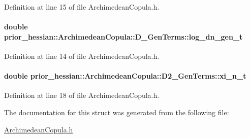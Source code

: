 Definition at line 15 of file Archimedean\+Copula.\+h.

\paragraph[{\texorpdfstring{log\+\_\+dn\+\_\+gen\+\_\+t}{log_dn_gen_t}}]{\setlength{\rightskip}{0pt plus 5cm}double prior\+\_\+hessian\+::\+Archimedean\+Copula\+::\+D\+\_\+\+Gen\+Terms\+::log\+\_\+dn\+\_\+gen\+\_\+t\hspace{0.3cm}{\ttfamily [inherited]}}\hypertarget{structprior__hessian_1_1ArchimedeanCopula_1_1D__GenTerms_a32ee7fddd5bbd1af598c8d21015c7125}{}\label{structprior__hessian_1_1ArchimedeanCopula_1_1D__GenTerms_a32ee7fddd5bbd1af598c8d21015c7125}


Definition at line 14 of file Archimedean\+Copula.\+h.

\paragraph[{\texorpdfstring{xi\+\_\+n\+\_\+t}{xi_n_t}}]{\setlength{\rightskip}{0pt plus 5cm}double prior\+\_\+hessian\+::\+Archimedean\+Copula\+::\+D2\+\_\+\+Gen\+Terms\+::xi\+\_\+n\+\_\+t}\hypertarget{structprior__hessian_1_1ArchimedeanCopula_1_1D2__GenTerms_aadd126868dd8a82b8189ba2fe50d7503}{}\label{structprior__hessian_1_1ArchimedeanCopula_1_1D2__GenTerms_aadd126868dd8a82b8189ba2fe50d7503}


Definition at line 18 of file Archimedean\+Copula.\+h.



The documentation for this struct was generated from the following file\+:\begin{DoxyCompactItemize}
\item 
\hyperlink{ArchimedeanCopula_8h}{Archimedean\+Copula.\+h}\end{DoxyCompactItemize}
